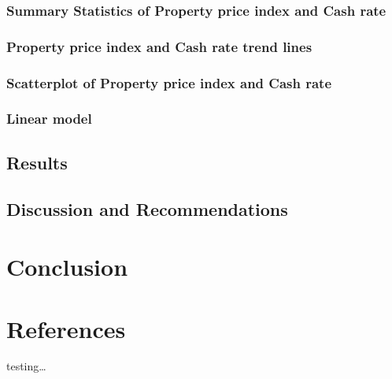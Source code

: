 \documentclass[11pt,a4paper,]{article}
\begin{document}
\hypertarget{summary-statistics-of-property-price-index-and-cash-rate}{%
\subsubsection{Summary Statistics of Property price index and Cash rate}\label{summary-statistics-of-property-price-index-and-cash-rate}}

\hypertarget{property-price-index-and-cash-rate-trend-lines}{%
\subsubsection{Property price index and Cash rate trend lines}\label{property-price-index-and-cash-rate-trend-lines}}

\hypertarget{scatterplot-of-property-price-index-and-cash-rate}{%
\subsubsection{Scatterplot of Property price index and Cash rate}\label{scatterplot-of-property-price-index-and-cash-rate}}

\hypertarget{linear-model-2}{%
\subsubsection{Linear model}\label{linear-model-2}}

\hypertarget{results-3}{%
\subsection{Results}\label{results-3}}

\hypertarget{discussion-and-recommendations-3}{%
\subsection{Discussion and Recommendations}\label{discussion-and-recommendations-3}}

\hypertarget{conclusion}{%
\section{Conclusion}\label{conclusion}}

\hypertarget{references}{%
\section{References}\label{references}}

testing\ldots{}

\printbibliography
\end{document}
